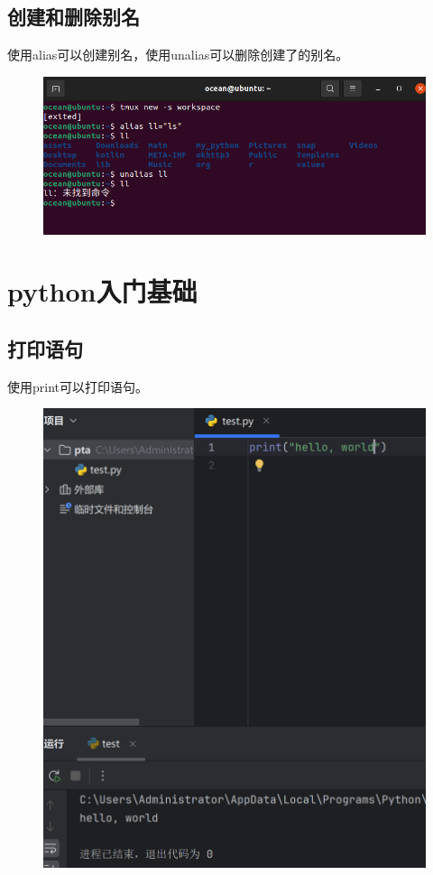 \documentclass{article}
\begin{document}
\subsection{创建和删除别名}
使用alias可以创建别名，使用unalias可以删除创建了的别名。
\begin{figure}[H]
    \centering
    \includegraphics[width=1\linewidth]{alias.png}
\end{figure}


\section{python入门基础}
\subsection{打印语句}
使用print可以打印语句。
\begin{figure}  [H]
    \centering
    \includegraphics[width=1\linewidth]{print.png}
\end{figure}
\end{document}
